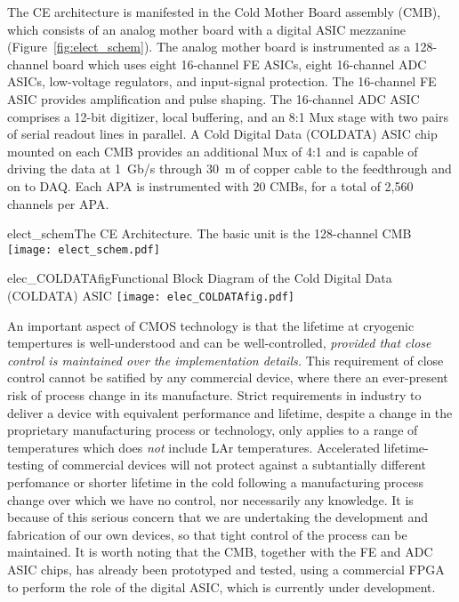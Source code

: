 The CE architecture is manifested in the Cold Mother Board assembly (CMB),
which consists of an analog mother board with a digital ASIC mezzanine (Figure~\ref{fig:elect_schem}).
The analog mother board is instrumented as a 128-channel board which uses eight 16-channel FE ASICs,
eight 16-channel ADC ASICs, low-voltage regulators, and input-signal protection.
The 16-channel FE ASIC provides amplification and pulse shaping.
The 16-channel ADC ASIC comprises a 12-bit digitizer, local buffering,
and an 8:1 Mux stage with two pairs of serial readout lines in parallel.
A Cold Digital Data (COLDATA) ASIC chip mounted on each CMB provides an additional Mux of 4:1 and
is capable of driving the data at 1~Gb/s through 30~m of copper cable to the feedthrough and on to DAQ. 
Each APA is instrumented with 20 CMBs, for a total of 2,560 channels per APA.
\begin{cdrfigure}{elect_schem}{The CE Architecture. The basic unit is the 128-channel CMB}
\texttt{[image: elect\_schem.pdf]}
\end{cdrfigure}
\begin{cdrfigure}{elec_COLDATAfig}{Functional Block Diagram of the Cold Digital Data (COLDATA) ASIC}
\texttt{[image: elec\_COLDATAfig.pdf]}
\end{cdrfigure}

An important aspect of CMOS technology is that the lifetime at cryogenic tempertures is well-understood and can be
well-controlled, {\em provided that close control is maintained over the implementation details.}
This requirement of close control cannot be satified by any commercial device,
where there an ever-present risk of process change in its manufacture.
Strict requirements in industry to deliver a device with equivalent performance and lifetime,
despite a change in the proprietary manufacturing process or technology,
only applies to a range of temperatures which does {\em not} include LAr temperatures.
Accelerated lifetime-testing of commercial devices will not protect against 
a subtantially different perfomance or shorter lifetime in the cold following a manufacturing process change
over which we have no control, nor necessarily any knowledge.
It is because of this serious concern that we are undertaking the development and fabrication of our own devices, 
so that tight control of the process can be maintained.
It is worth noting that the CMB, together with the FE and ADC ASIC chips, has already been prototyped and tested,
using a commercial FPGA to perform the role of the digital ASIC,
which is currently under development.

